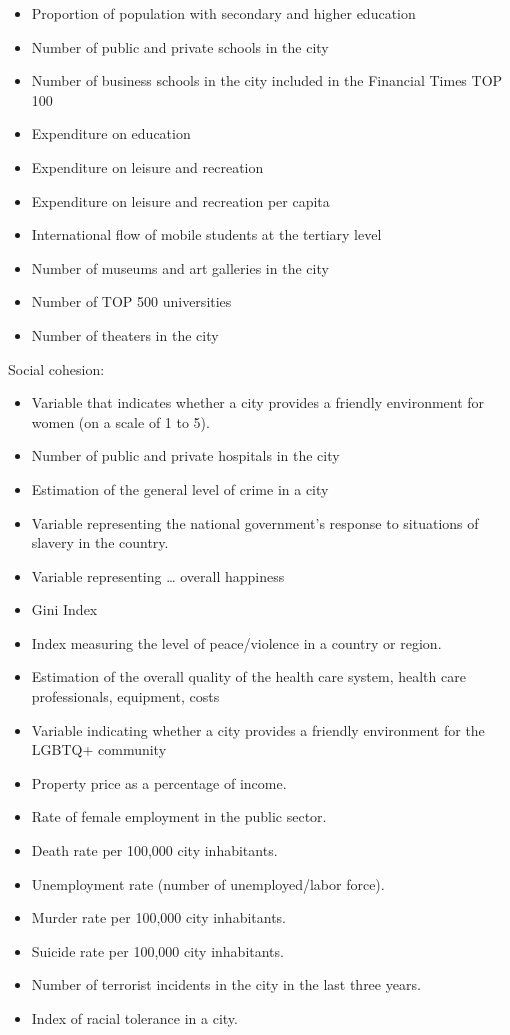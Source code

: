 \documentclass[
  english,
  12pt,
  a4paper,
]{scrartcl}
\providecommand{\tightlist}{%
  \setlength{\itemsep}{0pt}\setlength{\parskip}{0pt}}
\begin{document}
\begin{itemize}
\tightlist
\item
  Proportion of population with secondary and higher education
\item
  Number of public and private schools in the city
\item
  Number of business schools in the city included in the Financial Times
  TOP 100
\item
  Expenditure on education
\item
  Expenditure on leisure and recreation
\item
  Expenditure on leisure and recreation per capita
\item
  International flow of mobile students at the tertiary level
\item
  Number of museums and art galleries in the city
\item
  Number of TOP 500 universities
\item
  Number of theaters in the city
\end{itemize}

Social cohesion:

\begin{itemize}
\tightlist
\item
  Variable that indicates whether a city provides a friendly environment
  for women (on a scale of 1 to 5).
\item
  Number of public and private hospitals in the city
\item
  Estimation of the general level of crime in a city
\item
  Variable representing the national government's response to situations
  of slavery in the country.
\item
  Variable representing \ldots{} overall happiness
\item
  Gini Index
\item
  Index measuring the level of peace/violence in a country or region.
\item
  Estimation of the overall quality of the health care system, health
  care professionals, equipment, costs
\item
  Variable indicating whether a city provides a friendly environment for
  the LGBTQ+ community
\item
  Property price as a percentage of income.
\item
  Rate of female employment in the public sector.
\item
  Death rate per 100,000 city inhabitants.
\item
  Unemployment rate (number of unemployed/labor force).
\item
  Murder rate per 100,000 city inhabitants.
\item
  Suicide rate per 100,000 city inhabitants.
\item
  Number of terrorist incidents in the city in the last three years.
\item
  Index of racial tolerance in a city.
\end{itemize}
\end{document}
